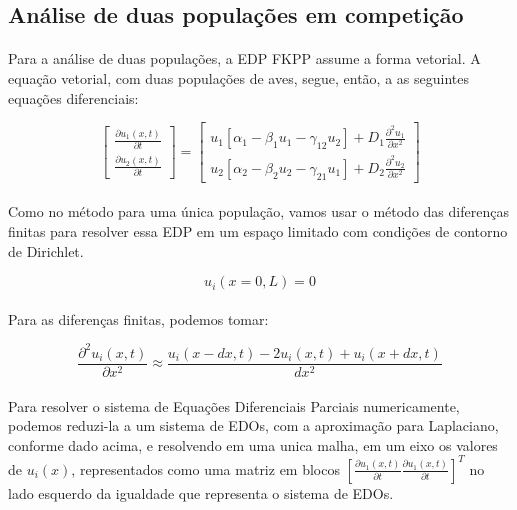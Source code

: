 \documentclass{article}
\begin{document}
	\subsection{Análise de duas populações em competição}
	
	\paragraph{}
	Para a análise de duas populações, a EDP FKPP assume a forma vetorial. A equação vetorial, com duas populações de aves, segue, então, a as seguintes equações diferenciais:
	
	$$ \left[ \begin{array}{c}
		\frac{\partial u_1(x,t)}{\partial t} \\
		\frac{\partial u_2(x,t)}{\partial t} \end{array} \right]
	=
	\left[ \begin{array}{cc}
		u_1 \left[\alpha_1 - \beta_1 u_1  - \gamma_{12} u_2 \right] + D_1 \frac{\partial^2 u_1}{\partial x^2} \\
		u_2 \left[\alpha_2 - \beta_2 u_2  - \gamma_{21} u_1 \right] + D_2 \frac{\partial^2 u_2}{\partial x^2} \end{array} \right]$$
	
	\paragraph{}
	Como no método para uma única população, vamos usar o método das diferenças finitas para resolver essa EDP em um espaço limitado com condições de contorno de Dirichlet.
	
	$$u_i(x=0,L) = 0 $$
	
	\paragraph{}
	Para as diferenças finitas, podemos tomar:
	
	$$ \frac{\partial^2 u_i(x,t)}{\partial x^2} \approx \frac{u_i(x-dx,t) - 2u_i(x,t) + u_i(x+dx,t)}{dx^2}$$
	
	\paragraph{}
	Para resolver o sistema de Equações Diferenciais Parciais numericamente, podemos reduzi-la a um sistema de EDOs, com a aproximação para Laplaciano, conforme dado acima, e resolvendo em uma unica malha, em um eixo os valores de $u_i(x)$, representados como uma matriz em blocos $\left[\frac{\partial u_1(x,t)}{\partial t} \frac{\partial u_1(x,t)}{\partial t}\right]^T$ no lado esquerdo da igualdade que representa o sistema de EDOs.
\end{document}

